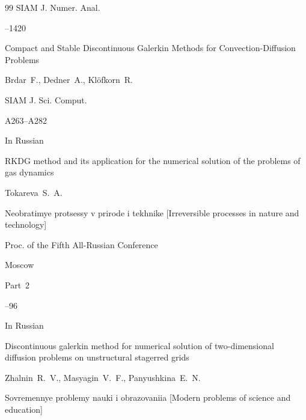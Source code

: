 \begin{thebibliography}{99}
\jour SIAM J. Numer. Anal.




--1420





\paper  Compact and Stable Discontinuous Galerkin Methods for Convection-Diffusion Problems 

\by Brdar~F., Dedner~A., Kl\"ofkorn~R.

\jour SIAM J. Sci. Comput.




\pages A263--A282







\lang In Russian

\paper RKDG method and its application for the numerical solution of the problems of gas dynamics

\by Tokareva~S.~A.

\inbook Neobratimye protsessy v prirode i tekhnike \rm [Irreversible processes in nature and technology]

\bookinfo Proc. of the Fifth All-Russian Conference

\publaddr Moscow


\volinfo Part~2

--96






\lang In Russian 

\paper Discontinuous galerkin method for numerical solution of two-dimensional diffusion problems on unstructural stagerred grids 

\by Zhalnin~R.~V., Masyagin~V.~F., Panyushkina~E.~N.

\jour Sovremennye problemy nauki i obrazovaniia \rm [Modern problems of science and education]




\end{thebibliography}
